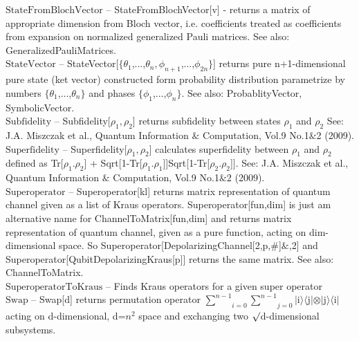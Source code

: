\documentclass[a4paper,10pt]{scrartcl}
\begin{document}
\textbf{$ \text{StateFromBlochVector} $ }-- StateFromBlochVector[v] - returns a matrix of appropriate dimension from Bloch vector, i.e. coefficients treated as coefficients from expansion on normalized generalized Pauli matrices. See also: GeneralizedPauliMatrices.$  $\\

\textbf{$ \text{StateVector} $ }-- StateVector[$\{$$ \theta _1 $,...,$ \theta _n,\phi _{n+1} $,...,$ \phi _{2 n} $$\}$] returns pure n+1-dimensional pure state (ket vector) constructed form probability distribution parametrize by numbers $\{$$ \theta _1 $,...,$ \theta _n $$\}$ and phases $\{$$ \phi _1 $,...,$ \phi _n $$\}$. See also: ProbablityVector, SymbolicVector.$  $\\

\textbf{$ \text{Subfidelity} $ }-- Subfidelity[$ \rho _1,\rho _2 $] returns subfidelity between states $ \rho _1 $ and $ \rho _2 $ See: J.A. Miszczak et al., Quantum Information $\&$ Computation, Vol.9 No.1$\&$2 (2009).$  $\\

\textbf{$ \text{Superfidelity} $ }-- Superfidelity[$ \rho _1,\rho _2 $] calculates superfidelity between $ \rho _1 $ and $ \rho _2 $ defined as Tr[$ \rho _1.\rho _2 $] + Sqrt[1-Tr[$ \rho _1.\rho _1 $]]Sqrt[1-Tr[$ \rho _2.\rho _2 $]]. See: J.A. Miszczak et al., Quantum Information $\&$ Computation, Vol.9 No.1$\&$2 (2009).$  $\\

\textbf{$ \text{Superoperator} $ }-- Superoperator[kl] returns matrix representation of quantum channel given as a list of Kraus operators. Superoperator[fun,dim] is just am alternative name for ChannelToMatrix[fun,dim] and returns matrix representation of quantum channel, given as a pure function, acting on dim-dimensional space. So Superoperator[DepolarizingChannel[2,p,$\#$]$\&$,2] and Superoperator[QubitDepolarizingKraus[p]] returns the same matrix. See also: ChannelToMatrix.$  $\\

\textbf{$ \text{SuperoperatorToKraus} $ }-- Finds Kraus operators for a given super operator$  $\\

\textbf{$ \text{Swap} $ }-- Swap[d] returns permutation operator $ \underset{i=0}{\overset{n-1}{ \sum }}\underset{j=0}{\overset{n-1}{ \sum }} $$|$i$\rangle \langle $j$|\otimes |$j$\rangle \langle $i$|$ acting on d-dimensional, d=$ n^2 $ space and exchanging two $\surd $d-dimensional subsystems.$  $\\
\end{document}
